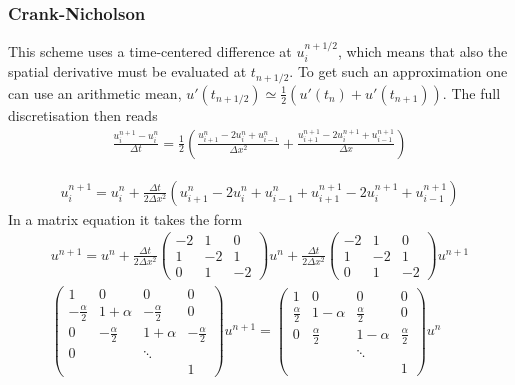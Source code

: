 \documentclass[11pt,a4paper,draft]{article}
\numberwithin{equation}{section}
\begin{document}
\subsubsection{Crank-Nicholson}
This scheme uses a time-centered difference at $u_i^{n+1/2}$, which means that also the spatial derivative must be evaluated at $t_{n+1/2}$. To get such an approximation one can use an arithmetic mean, $u'(t_{n+1/2}) \simeq \frac{1}{2}(u'(t_{n}) + u'(t_{n+1}))$. The full discretisation then reads 
\begin{gather}
\frac{u_{i}^{n+1}-u_{i}^{n}}{\Delta t} = \frac{1}{2} \left( \frac{u_{i+1}^{n} -2 u_{i}^{n}+u_{i-1}^{n}}{\Delta x^2} + \frac{u_{i+1}^{n+1} -2u_{i}^{n+1}+u_{i-1}^{n+1} }{\Delta x} \right)
\end{gather}


\begin{gather}
u_i^{n+1} = u_i^n + \frac{\Delta t}{2\Delta x^2}\left(
u_{i+1}^n - 2u_i^n + u_{i-1}^n + u_{i+1}^{n+1} - 2u_i^{n+1} + u_{i-1}^{n+1}
\right)
\end{gather}
In a matrix equation it takes the form
\begin{gather}
u^{n+1} = u^n + \frac{\Delta t}{2\Delta x^2}
\begin{pmatrix}
-2 & 1 & 0\\
1 & -2 & 1\\
0 & 1 & -2
\end{pmatrix} u^n
 + \frac{\Delta t}{2\Delta x^2}
\begin{pmatrix}
-2 & 1 & 0\\
1 & -2 & 1\\
0 & 1 & -2
\end{pmatrix}u^{n+1}\\
\begin{pmatrix}
1 & 0 & 0 & 0\\
-\frac{\alpha}{2} & 1 + \alpha & -\frac{\alpha}{2} & 0\\
0 & -\frac{\alpha}{2} & 1 + \alpha & -\frac{\alpha}{2}\\
0 & & \ddots\\
&&& 1
\end{pmatrix}
u^{n+1} = 
\begin{pmatrix}
1 & 0 & 0 & 0\\
\frac{\alpha}{2} & 1 - \alpha & \frac{\alpha}{2} &  0\\
0 & \frac{\alpha}{2} & 1 - \alpha & \frac{\alpha}{2}\\
&& \ddots\\
&&&1
\end{pmatrix}u^n
\end{gather}
\end{document}
